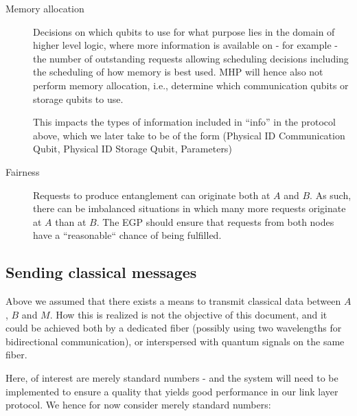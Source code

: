\documentclass{article}
\begin{document}
\begin{description}
\item[Memory allocation]
Decisions on which qubits to use for what purpose lies in the domain of higher level logic, where more information is available
on - for example - the number of outstanding requests allowing scheduling decisions including the scheduling of how memory is best used.
MHP will hence also not perform memory allocation, i.e., determine which communication qubits or storage qubits to use.

This impacts the types of information included in ``info'' in the protocol above, which we later take to be of the form (Physical ID Communication Qubit, Physical ID Storage Qubit, Parameters)

\item[Fairness]
Requests to produce entanglement can originate both at $A$ and $B$. As such, there can be imbalanced situations in which many more requests originate at $A$ than at $B$. The EGP should ensure that requests from both nodes have a ``reasonable`` chance of being fulfilled.
\end{description}

\subsection{Sending classical messages}\label{sec:classicalMessages}

Above we assumed that there exists a means to transmit classical data between $A$, $B$ and $M$. How this is realized is not the objective of this document, and it could be achieved both by a dedicated fiber (possibly using two wavelengths for bidirectional communication), or interspersed with quantum signals on the same fiber.

Here, of interest are merely standard numbers - and the system will need to be implemented to ensure a quality that yields good performance in our link layer protocol.
We hence for now consider merely standard numbers:
\end{document}
